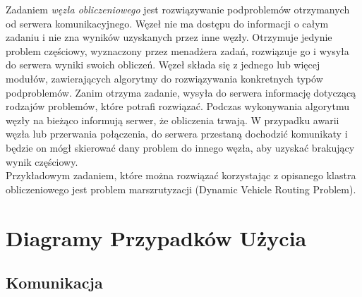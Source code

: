 \documentclass[12pt,a4paper,titlepage]{report}
\begin{document}
Zadaniem \textit{węzła obliczeniowego} jest rozwiązywanie podproblemów otrzymanych od serwera komunikacyjnego. Węzeł nie ma dostępu do informacji o całym zadaniu i nie zna wyników uzyskanych przez inne węzły. Otrzymuje jedynie problem częściowy, wyznaczony przez menadżera zadań, rozwiązuje go i wysyła do serwera wyniki swoich obliczeń. Węzeł składa się z jednego lub więcej modułów, zawierających algorytmy do rozwiązywania konkretnych typów podproblemów. Zanim otrzyma zadanie, wysyła do serwera informację dotyczącą rodzajów problemów, które potrafi rozwiązać. Podczas wykonywania algorytmu węzły na bieżąco informują serwer, że obliczenia trwają. W przypadku awarii węzła lub przerwania połączenia, do serwera przestaną dochodzić komunikaty i będzie on mógł skierować dany problem do innego węzła, aby uzyskać brakujący wynik częściowy.\\
Przykładowym zadaniem, które można rozwiązać korzystając z opisanego klastra obliczeniowego jest problem marszrutyzacji (Dynamic Vehicle Routing Problem).

	\chapter{Diagramy Przypadków Użycia}
		\section{Komunikacja}
\end{document}
